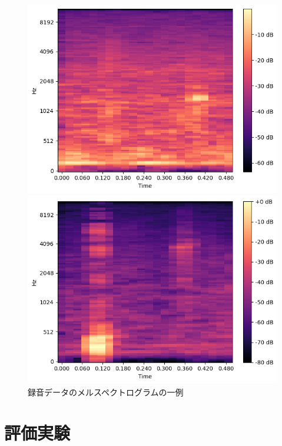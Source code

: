 \begin{figure}[t]
\begin{minipage}[b]{0.16\hsize}
        \includegraphics[width=\hsize]{img/melspec/jelly.png}
    \end{minipage}
    \begin{minipage}[b]{0.16\hsize}
        \centering
        \includegraphics[width=\hsize]{img/melspec/grilled-fish.png}
    \end{minipage}
    \caption{録音データのメルスペクトログラムの一例}
    \label{fig:sample-melspec-data}
\end{figure}

\chapter{評価実験}

